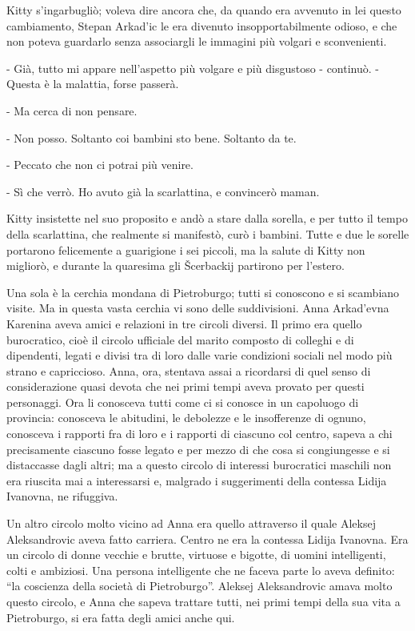 Kitty s'ingarbugliò; voleva dire ancora che, da quando era avvenuto in lei questo cambiamento, Stepan Arkad'ic le era divenuto insopportabilmente odioso, e che non poteva guardarlo senza associargli le immagini più volgari e sconvenienti. 

- Già, tutto mi appare nell'aspetto più volgare e più disgustoso - continuò. - Questa è la malattia, forse passerà. 

- Ma cerca di non pensare. 

- Non posso. Soltanto coi bambini sto bene. Soltanto da te. 

- Peccato che non ci potrai più venire. 

- Sì che verrò. Ho avuto già la scarlattina, e convincerò maman. 

Kitty insistette nel suo proposito e andò a stare dalla sorella, e per tutto il tempo della scarlattina, che realmente si manifestò, curò i bambini. Tutte e due le sorelle portarono felicemente a guarigione i sei piccoli, ma la salute di Kitty non migliorò, e durante la quaresima gli Šcerbackij partirono per l'estero. 

\label{iv-1} 

Una sola è la cerchia mondana di Pietroburgo; tutti si conoscono e si scambiano visite. Ma in questa vasta cerchia vi sono delle suddivisioni. Anna Arkad'evna Karenina aveva amici e relazioni in tre circoli diversi. Il primo era quello burocratico, cioè il circolo ufficiale del marito composto di colleghi e di dipendenti, legati e divisi tra di loro dalle varie condizioni sociali nel modo più strano e capriccioso. Anna, ora, stentava assai a ricordarsi di quel senso di considerazione quasi devota che nei primi tempi aveva provato per questi personaggi. Ora li conosceva tutti come ci si conosce in un capoluogo di provincia: conosceva le abitudini, le debolezze e le insofferenze di ognuno, conosceva i rapporti fra di loro e i rapporti di ciascuno col centro, sapeva a chi precisamente ciascuno fosse legato e per mezzo di che cosa si congiungesse e si distaccasse dagli altri; ma a questo circolo di interessi burocratici maschili non era riuscita mai a interessarsi e, malgrado i suggerimenti della contessa Lidija Ivanovna, ne rifuggiva. 

Un altro circolo molto vicino ad Anna era quello attraverso il quale Aleksej Aleksandrovic aveva fatto carriera. Centro ne era la contessa Lidija Ivanovna. Era un circolo di donne vecchie e brutte, virtuose e bigotte, di uomini intelligenti, colti e ambiziosi. Una persona intelligente che ne faceva parte lo aveva definito: ``la coscienza della società di Pietroburgo''. Aleksej Aleksandrovic amava molto questo circolo, e Anna che sapeva trattare tutti, nei primi tempi della sua vita a Pietroburgo, si era fatta degli amici anche qui. 

